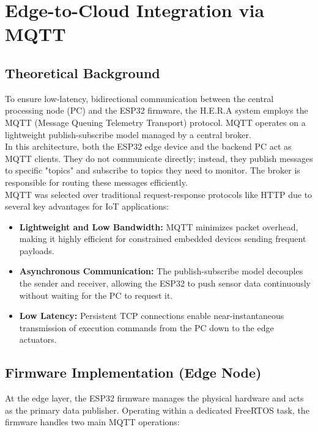 \newpage

\section{Edge-to-Cloud Integration via MQTT}

\subsection{Theoretical Background}
To ensure low-latency, bidirectional communication between the central processing node (PC) and the ESP32 firmware, the H.E.R.A system employs the MQTT (Message Queuing Telemetry Transport) protocol. MQTT operates on a lightweight publish-subscribe model managed by a central broker. \\

In this architecture, both the ESP32 edge device and the backend PC act as MQTT clients. They do not communicate directly; instead, they publish messages to specific "topics" and subscribe to topics they need to monitor. The broker is responsible for routing these messages efficiently. \\

MQTT was selected over traditional request-response protocols like HTTP due to several key advantages for IoT applications:
\begin{itemize}
    \item \textbf{Lightweight and Low Bandwidth:} MQTT minimizes packet overhead, making it highly efficient for constrained embedded devices sending frequent payloads.
    \item \textbf{Asynchronous Communication:} The publish-subscribe model decouples the sender and receiver, allowing the ESP32 to push sensor data continuously without waiting for the PC to request it.
    \item \textbf{Low Latency:} Persistent TCP connections enable near-instantaneous transmission of execution commands from the PC down to the edge actuators.
\end{itemize}

\subsection{Firmware Implementation (Edge Node)}
At the edge layer, the ESP32 firmware manages the physical hardware and acts as the primary data publisher. Operating within a dedicated FreeRTOS task, the firmware handles two main MQTT operations:

